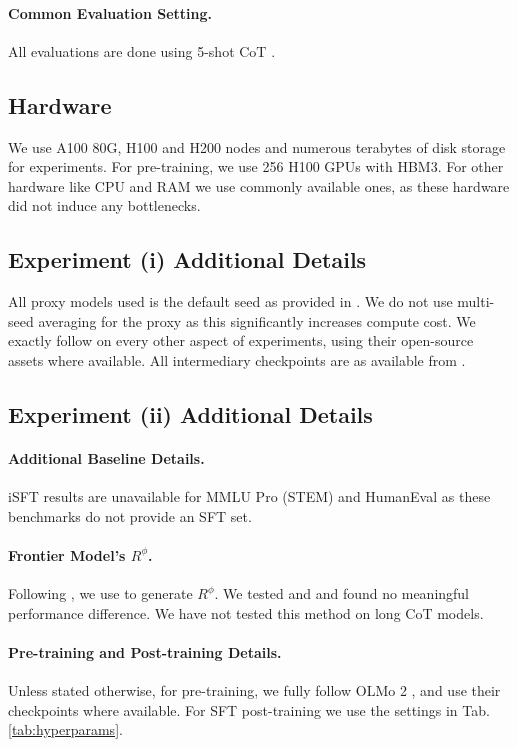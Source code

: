 \paragraph{Common Evaluation Setting.} All evaluations are done using 5-shot CoT \citep{NEURIPS2022_9d560961}.

\subsection{Hardware} We use A100 80G, H100 and H200 nodes and numerous terabytes of disk storage for experiments. For pre-training, we use 256 H100 GPUs with HBM3. For other hardware like CPU and RAM we use commonly available ones, as these hardware did not induce any bottlenecks. 


\subsection{Experiment (i) Additional Details} All proxy models used is the default seed as provided in \cite{magnusson2025datadecide}. We do not use multi-seed averaging for the proxy as this significantly increases compute cost. We exactly follow  \cite{magnusson2025datadecide} on every other aspect of experiments, using their open-source assets where available. All intermediary checkpoints are as available from \cite{magnusson2025datadecide}.

\subsection{Experiment (ii) Additional Details} 

\paragraph{Additional Baseline Details.} iSFT results are unavailable for MMLU Pro (STEM) and HumanEval as these benchmarks do not provide an SFT set.

\paragraph{Frontier Model's $R^\phi$.} Following \cite{team2025minicpm4}, we use  to generate $R^\phi$. We tested  and  and found no meaningful performance difference. We have not tested this method on long CoT models.

\paragraph{Pre-training and Post-training Details.} Unless stated otherwise, for pre-training, we fully follow OLMo 2 \citep{olmo20242}, and use their checkpoints where available. For SFT post-training we use the settings in Tab. \ref{tab:hyperparams}.

